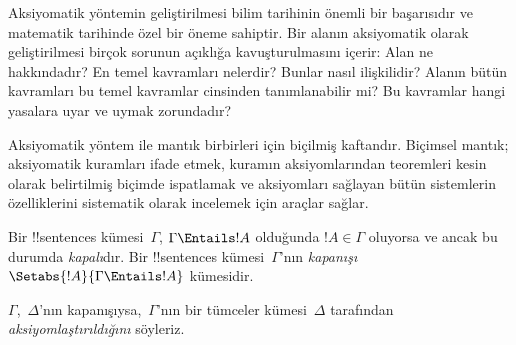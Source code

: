 \documentclass[../../../include/open-logic-section]{subfiles}
\begin{document}

\begin{explain}
Aksiyomatik yöntemin geliştirilmesi bilim tarihinin önemli bir
başarısıdır ve matematik tarihinde özel bir öneme sahiptir. Bir alanın
aksiyomatik olarak geliştirilmesi birçok sorunun açıklığa
kavuşturulmasını içerir: Alan ne hakkındadır? En temel kavramları
nelerdir? Bunlar nasıl ilişkilidir? Alanın bütün kavramları bu temel
kavramlar cinsinden tanımlanabilir mi? Bu kavramlar hangi yasalara uyar
ve uymak zorundadır?

Aksiyomatik yöntem ile mantık birbirleri için biçilmiş kaftandır.
Biçimsel mantık; aksiyomatik kuramları ifade etmek, kuramın
aksiyomlarından teoremleri kesin olarak belirtilmiş biçimde ispatlamak
ve aksiyomları sağlayan bütün sistemlerin özelliklerini sistematik
olarak incelemek için araçlar sağlar.
\end{explain}

\begin{defn}
Bir !!{sentence}s kümesi~$\Gamma$, $\Gamma\Entails !A$ olduğunda
$!A\in\Gamma$ oluyorsa ve ancak bu durumda \emph{kapalı}dır. Bir
!!{sentence}s kümesi~$\Gamma$'nın \emph{kapanışı}
$\Setabs{!A}{\Gamma\Entails !A}$ kümesidir.

$\Gamma$,~$\Delta$'nın kapanışıysa,~$\Gamma$'nın bir tümceler
kümesi~$\Delta$ tarafından \emph{aksiyomlaştırıldığını} söyleriz.
\end{defn}
\end{document}
